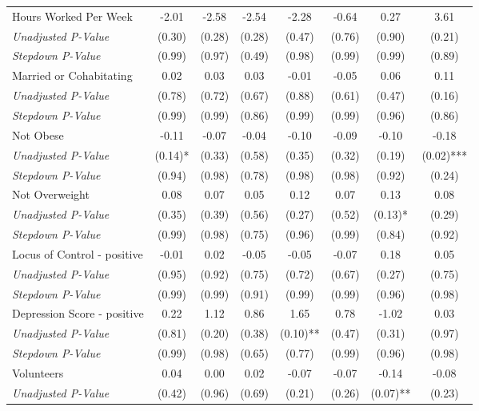 \begin{tabular}{l c c c c c c c}
Hours Worked Per Week & -2.01 & -2.58 & -2.54 & -2.28 & -0.64 & 0.27 & 3.61 \\
\quad \textit{Unadjusted P-Value} & (0.30) & (0.28) & (0.28) & (0.47) & (0.76) & (0.90) & (0.21) \\
\quad \textit{Stepdown P-Value} & (0.99) & (0.97) & (0.49) & (0.98) & (0.99) & (0.99) & (0.89) \\
Married or Cohabitating & 0.02 & 0.03 & 0.03 & -0.01 & -0.05 & 0.06 & 0.11 \\
\quad \textit{Unadjusted P-Value} & (0.78) & (0.72) & (0.67) & (0.88) & (0.61) & (0.47) & (0.16) \\
\quad \textit{Stepdown P-Value} & (0.99) & (0.99) & (0.86) & (0.99) & (0.99) & (0.96) & (0.86) \\
Not Obese & -0.11 & -0.07 & -0.04 & -0.10 & -0.09 & -0.10 & -0.18 \\
\quad \textit{Unadjusted P-Value} & (0.14)* & (0.33) & (0.58) & (0.35) & (0.32) & (0.19) & (0.02)*** \\
\quad \textit{Stepdown P-Value} & (0.94) & (0.98) & (0.78) & (0.98) & (0.98) & (0.92) & (0.24) \\
Not Overweight & 0.08 & 0.07 & 0.05 & 0.12 & 0.07 & 0.13 & 0.08 \\
\quad \textit{Unadjusted P-Value} & (0.35) & (0.39) & (0.56) & (0.27) & (0.52) & (0.13)* & (0.29) \\
\quad \textit{Stepdown P-Value} & (0.99) & (0.98) & (0.75) & (0.96) & (0.99) & (0.84) & (0.92) \\
Locus of Control - positive & -0.01 & 0.02 & -0.05 & -0.05 & -0.07 & 0.18 & 0.05 \\
\quad \textit{Unadjusted P-Value} & (0.95) & (0.92) & (0.75) & (0.72) & (0.67) & (0.27) & (0.75) \\
\quad \textit{Stepdown P-Value} & (0.99) & (0.99) & (0.91) & (0.99) & (0.99) & (0.96) & (0.98) \\
Depression Score - positive & 0.22 & 1.12 & 0.86 & 1.65 & 0.78 & -1.02 & 0.03 \\
\quad \textit{Unadjusted P-Value} & (0.81) & (0.20) & (0.38) & (0.10)** & (0.47) & (0.31) & (0.97) \\
\quad \textit{Stepdown P-Value} & (0.99) & (0.98) & (0.65) & (0.77) & (0.99) & (0.96) & (0.98) \\
Volunteers & 0.04 & 0.00 & 0.02 & -0.07 & -0.07 & -0.14 & -0.08 \\
\quad \textit{Unadjusted P-Value} & (0.42) & (0.96) & (0.69) & (0.21) & (0.26) & (0.07)** & (0.23) \\

\end{tabular}
